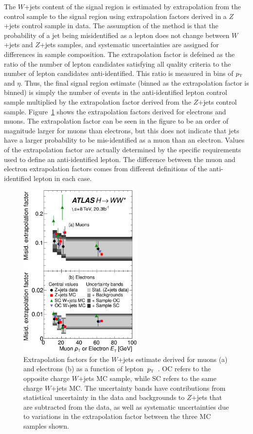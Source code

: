 The $W$+jets content of the signal region is estimated by extrapolation from the control sample to the signal region using extrapolation factors derived in a $Z$+jets control sample in data. The assumption of the method is that the probability of a jet being misidentified as a lepton does not change between $W$+jets and $Z$+jets samples, and systematic uncertainties are assigned for differences in sample composition. The extrapolation factor is defeined as the ratio of the number of lepton candidates satisfying all quality criteria to the number of lepton candidates anti-identified. This ratio is measured in bins of $p_{\textrm{\footnotesize\sc t}}$ and $\eta$. Thus, the final signal region estimate (binned as the extrapolation factor is binned) is simply the number of events in the anti-identified lepton control sample multiplied by the extrapolation factor derived from the $Z$+jets control sample. Figure~\ref{fig:VBF_extrap_Wjets} shows the extrapolation factors derived for electrons and muons.  The extrapolation factor can be seen in the figure to be an order of magnitude larger for muons than electrons, but this does not indicate that jets have a larger probability to be mis-identified as a muon than an electron. Values of the extrapolation factor are actually determined by the specific requirements used to define an anti-identified lepton. The difference between the muon and electron extrapolation factors comes from different definitions of the anti-identified lepton in each case.

\begin{figure}[h!]
  \centering
  \captionsetup{justification=centering}
  \includegraphics[width=0.55\textwidth]{figures/VBF_Wjets_extrap}
  \caption{Extrapolation factors for the $W$+jets estimate derived for muons (a) and electrons (b) as a function of lepton~$p_{\textrm{\footnotesize\sc t}}$~\cite{WW2015}. OC refers to the opposite charge $W$+jets MC sample, while SC refers to the same charge $W$+jets MC. The uncertainty bands have contributions from statistical uncertainty in the data and backgrounds to $Z$+jets that are subtracted from the data, as well as systematic uncertainties due to variations in the extrapolation factor between the three MC samples shown.}
  \label{fig:VBF_extrap_Wjets}
\end{figure}

